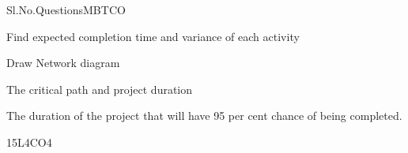 \documentclass{rvcepaper}
\begin{document}
\begin{iempaperB}
\begin{gtable}[PART -- B]{Sl.\newline No.}{Questions}{M}{BT}{CO}
{\begin{romi}\item[i.] Find expected completion time and variance of each activity\item[ii.] Draw Network diagram\item[iii.] The critical path and project duration\item[iv.] The duration of the project that will have 95 per cent chance of being completed.\end{romi}}{15}{L4}{CO4}
\end{gtable}
\stars{*****}
\end{iempaperB}
\end{document}
